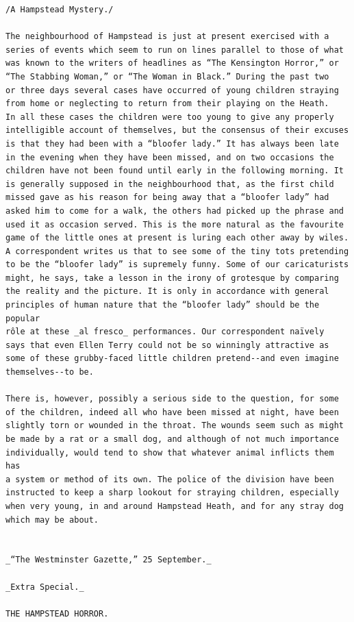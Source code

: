 \documentclass{article}
\begin{document}
\begin{verbatim}
/A Hampstead Mystery./

The neighbourhood of Hampstead is just at present exercised with a
series of events which seem to run on lines parallel to those of what
was known to the writers of headlines as “The Kensington Horror,” or
“The Stabbing Woman,” or “The Woman in Black.” During the past two
or three days several cases have occurred of young children straying
from home or neglecting to return from their playing on the Heath.
In all these cases the children were too young to give any properly
intelligible account of themselves, but the consensus of their excuses
is that they had been with a “bloofer lady.” It has always been late
in the evening when they have been missed, and on two occasions the
children have not been found until early in the following morning. It
is generally supposed in the neighbourhood that, as the first child
missed gave as his reason for being away that a “bloofer lady” had
asked him to come for a walk, the others had picked up the phrase and
used it as occasion served. This is the more natural as the favourite
game of the little ones at present is luring each other away by wiles.
A correspondent writes us that to see some of the tiny tots pretending
to be the “bloofer lady” is supremely funny. Some of our caricaturists
might, he says, take a lesson in the irony of grotesque by comparing
the reality and the picture. It is only in accordance with general
principles of human nature that the “bloofer lady” should be the popular
rôle at these _al fresco_ performances. Our correspondent naïvely
says that even Ellen Terry could not be so winningly attractive as
some of these grubby-faced little children pretend--and even imagine
themselves--to be.

There is, however, possibly a serious side to the question, for some
of the children, indeed all who have been missed at night, have been
slightly torn or wounded in the throat. The wounds seem such as might
be made by a rat or a small dog, and although of not much importance
individually, would tend to show that whatever animal inflicts them has
a system or method of its own. The police of the division have been
instructed to keep a sharp lookout for straying children, especially
when very young, in and around Hampstead Heath, and for any stray dog
which may be about.


_“The Westminster Gazette,” 25 September._

_Extra Special._

THE HAMPSTEAD HORROR.


\end{verbatim}
\end{document}
